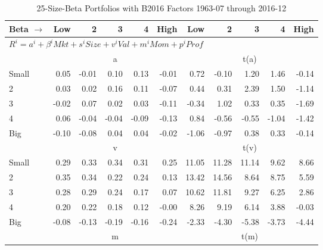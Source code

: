 
\begin{table}[!ht]
\centering
\caption{25-Size-Beta Portfolios with B2016 Factors 1963-07 through 2016-12}
\begin{tabular}{lrrrrrrrrrr}
  \toprule
    Beta $\rightarrow$ & Low & 2 & 3 & 4 & High & Low & 2 & 3 & 4 & High \\ 
  \midrule
  \multicolumn{11}{l}{$R^i=a^i+\beta^iMkt+s^iSize+v^iVal+m^iMom+p^iProf$} \\

  
    
      & \multicolumn{5}{c}{a} & \multicolumn{5}{c}{t(a)}
    
    \\
      \cmidrule(r){2-6} \cmidrule(r){7-11}

    Small   & 0.05  & -0.01  & 0.10  & 0.13  & -0.01  & 0.72  & -0.10  & 1.20  & 1.46  & -0.14  \\
         2  & 0.03  & 0.02  & 0.16  & 0.11  & -0.07  & 0.44  & 0.31  & 2.39  & 1.50  & -1.14  \\
         3  & -0.02  & 0.07  & 0.02  & 0.03  & -0.11  & -0.34  & 1.02  & 0.33  & 0.35  & -1.69  \\
         4  & 0.06  & -0.04  & -0.04  & -0.09  & -0.13  & 0.84  & -0.56  & -0.55  & -1.04  & -1.42  \\
    Big     & -0.10  & -0.08  & 0.04  & 0.04  & -0.02  & -1.06  & -0.97  & 0.38  & 0.33  & -0.14  \\

  
    
      & \multicolumn{5}{c}{v} & \multicolumn{5}{c}{t(v)}
    
    \\
      \cmidrule(r){2-6} \cmidrule(r){7-11}

    Small   & 0.29  & 0.33  & 0.34  & 0.31  & 0.25  & 11.05  & 11.28  & 11.14  & 9.62  & 8.66  \\
         2  & 0.35  & 0.34  & 0.22  & 0.24  & 0.13  & 13.42  & 14.56  & 8.64  & 8.75  & 5.59  \\
         3  & 0.28  & 0.29  & 0.24  & 0.17  & 0.07  & 10.62  & 11.81  & 9.27  & 6.25  & 2.86  \\
         4  & 0.20  & 0.22  & 0.18  & 0.12  & -0.00  & 8.26  & 9.19  & 6.14  & 3.88  & -0.03  \\
    Big     & -0.08  & -0.13  & -0.19  & -0.16  & -0.24  & -2.33  & -4.30  & -5.38  & -3.73  & -4.44  \\

  
    
      & \multicolumn{5}{c}{m} & \multicolumn{5}{c}{t(m)}
    

\end{tabular}
\end{table}
